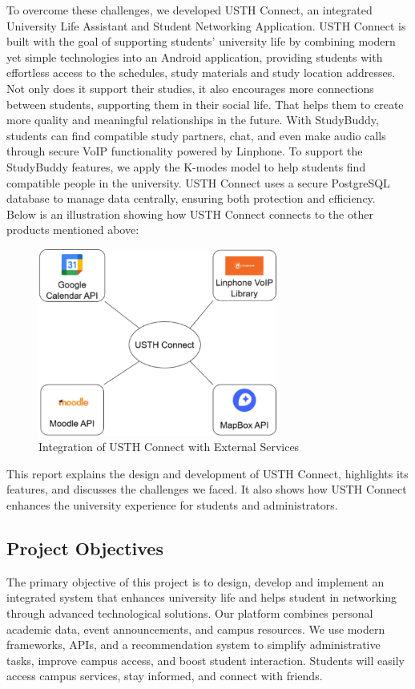 \documentclass[12pt]{article}
\begin{document}
To overcome these challenges, we developed USTH Connect, an integrated University Life Assistant and Student Networking Application. 
USTH Connect is built with the goal of supporting students' university life by combining modern yet simple technologies into an Android application, providing students with effortless access to the schedules, study materials and study location addresses.
Not only does it support their studies, it also encourages more connections between students, supporting them in their social life. That helps them to create more quality and meaningful relationships in the future.
With StudyBuddy, students can find compatible study partners, chat, and even make audio calls through secure VoIP functionality powered by Linphone.
To support the StudyBuddy features, we apply the K-modes model to help students find compatible people in the university.
USTH Connect uses a secure PostgreSQL database to manage data centrally, ensuring both protection and efficiency.\\

Below is an illustration showing how USTH Connect connects to the other products mentioned above: 
\begin{figure}[H]
    \centering
    \includegraphics[width=0.7\textwidth]{image/Integration-USTH-Connect-External-Services.pdf} 
    \caption{Integration of USTH Connect with External Services}
    \label{fig:integration-external-services}
\end{figure}

This report explains the design and development of USTH Connect, highlights its features, and discusses the challenges we faced. 
It also shows how USTH Connect enhances the university experience for students and administrators.

\subsection{Project Objectives}
The primary objective of this project is to design, develop and implement an integrated system that enhances university life and helps student in networking through advanced technological solutions.
Our platform combines personal academic data, event announcements, and campus resources.
We use modern frameworks, APIs, and a recommendation system to simplify administrative tasks, improve campus access, and boost student interaction.
Students will easily access campus services, stay informed, and connect with friends.
\end{document}
